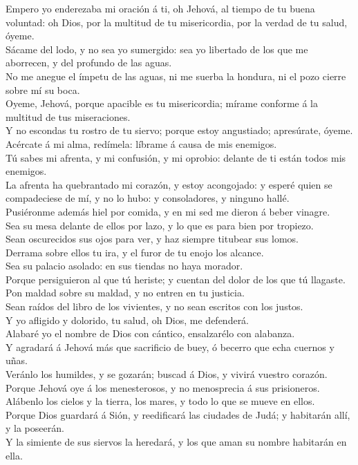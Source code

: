  Empero yo enderezaba mi oración á ti, oh Jehová, al tiempo
de tu buena voluntad: oh Dios, por la multitud de tu misericordia, por
la verdad de tu salud, óyeme.\\
 Sácame del lodo, y no sea yo sumergido: sea yo libertado
de los que me aborrecen, y del profundo de las aguas.\\
 No me anegue el ímpetu de las aguas, ni me suerba la
hondura, ni el pozo cierre sobre mí su boca.\\
 Oyeme, Jehová, porque apacible es tu misericordia; mírame
conforme á la multitud de tus miseraciones.\\
 Y no escondas tu rostro de tu siervo; porque estoy
angustiado; apresúrate, óyeme.\\
 Acércate á mi alma, redímela: líbrame á causa de mis
enemigos.\\
 Tú sabes mi afrenta, y mi confusión, y mi oprobio: delante
de ti están todos mis enemigos.\\
 La afrenta ha quebrantado mi corazón, y estoy acongojado:
y esperé quien se compadeciese de mí, y no lo hubo: y consoladores, y
ninguno hallé.\\
 Pusiéronme además hiel por comida, y en mi sed me dieron á
beber vinagre.\\
 Sea su mesa delante de ellos por lazo, y lo que es para
bien por tropiezo.\\
 Sean oscurecidos sus ojos para ver, y haz siempre titubear
sus lomos.\\
 Derrama sobre ellos tu ira, y el furor de tu enojo los
alcance.\\
 Sea su palacio asolado: en sus tiendas no haya morador.\\
 Porque persiguieron al que tú heriste; y cuentan del dolor
de los que tú llagaste.\\
 Pon maldad sobre su maldad, y no entren en tu justicia.\\
 Sean raídos del libro de los vivientes, y no sean escritos
con los justos.\\
 Y yo afligido y dolorido, tu salud, oh Dios, me
defenderá.\\
 Alabaré yo el nombre de Dios con cántico, ensalzarélo con
alabanza.\\
 Y agradará á Jehová más que sacrificio de buey, ó becerro
que echa cuernos y uñas.\\
 Veránlo los humildes, y se gozarán; buscad á Dios, y
vivirá vuestro corazón.\\
 Porque Jehová oye á los menesterosos, y no menosprecia á
sus prisioneros.\\
 Alábenlo los cielos y la tierra, los mares, y todo lo que
se mueve en ellos.\\
 Porque Dios guardará á Sión, y reedificará las ciudades de
Judá; y habitarán allí, y la poseerán.\\
 Y la simiente de sus siervos la heredará, y los que aman
su nombre habitarán en ella.

